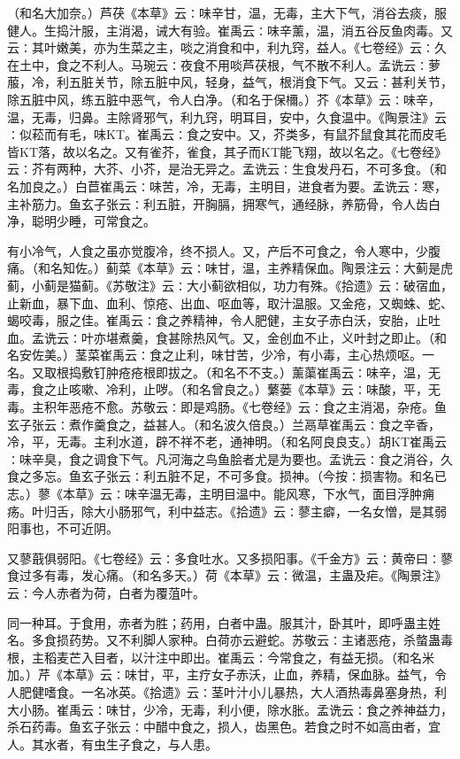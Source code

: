 \documentclass[a4paper,12pt,UTF8,twoside]{ctexbook}
\begin{document}
（和名大加奈。）芦茯《本草》云∶味辛甘，温，无毒，主大下气，消谷去痰，服健人。生捣汁服，主消渴，诫大有验。崔禹云∶味辛薰，温，消五谷反鱼肉毒。又云∶其叶嫩美，亦为生菜之主，啖之消食和中，利九窍，益人。《七卷经》云∶久在土中，食之不利人。马琬云∶夜食不用啖芦茯根，气不散不利人。孟诜云∶萝菔，冷，利五脏关节，除五脏中风，轻身，益气，根消食下气。又云∶甚利关节，除五脏中风，练五脏中恶气，令人白净。（和名于保檷。）芥《本草》云∶味辛，温，无毒，归鼻。主除肾邪气，利九窍，明耳目，安中，久食温中。《陶景注》云∶似菘而有毛，味KT。崔禹云∶食之安中。又，芥类多，有鼠芥鼠食其花而皮毛皆KT落，故以名之。又有雀芥，雀食，其子而KT能飞翔，故以名之。《七卷经》云∶芥有两种，大芥、小芥，是治无异之。孟诜云∶生食发丹石，不可多食。（和名加良之。）白苣崔禹云∶味苦，冷，无毒，主明目，进食者为要。孟诜云∶寒，主补筋力。鱼玄子张云∶利五脏，开胸膈，拥寒气，通经脉，养筋骨，令人齿白净，聪明少睡，可常食之。

有小冷气，人食之虽亦觉腹冷，终不损人。又，产后不可食之，令人寒中，少腹痛。（和名知佐。）蓟菜《本草》云∶味甘，温，主养精保血。陶景注云∶大蓟是虎蓟，小蓟是猫蓟。《苏敬注》云∶大小蓟欲相似，功力有殊。《拾遗》云∶破宿血，止新血，暴下血、血利、惊疮、出血、呕血等，取汁温服。又金疮，又蜘蛛、蛇、蝎咬毒，服之佳。崔禹云∶食之养精神，令人肥健，主女子赤白沃，安胎，止吐血。孟诜云∶叶亦堪煮羹，食甚除热风气。又，金创血不止，义叶封之即止。（和名安佐美。）茎菜崔禹云∶食之止利，味甘苦，少冷，有小毒，主心热烦呕。一名。又取根捣敷钉肿疮疮根即拔之。（和名不不支。）薰蕖崔禹云∶味辛，温，无毒，食之止咳嗽、冷利，止哕。（和名曾良之。）蘩蒌《本草》云∶味酸，平，无毒。主积年恶疮不愈。苏敬云∶即是鸡肠。《七卷经》云∶食之主消渴，杂疮。鱼玄子张云∶煮作羹食之，益甚人。（和名波久倍良。）兰鬲草崔禹云∶食之辛香，冷，平，无毒。主利水道，辟不祥不老，通神明。（和名阿良良支。）胡KT崔禹云∶味辛臭，食之调食下气。凡河海之鸟鱼脍者尤是为要也。孟诜云∶食之消谷，久食之多忘。鱼玄子张云∶利五脏不足，不可多食。损神。（今按∶损害物。和名已志。）蓼《本草》云∶味辛温无毒，主明目温中。能风寒，下水气，面目浮肿痈疡。叶归舌，除大小肠邪气，利中益志。《拾遗》云∶蓼主癖，一名女憎，是其弱阳事也，不可近阴。

又蓼蕺俱弱阳。《七卷经》云∶多食吐水。又多损阳事。《千金方》云∶黄帝曰∶蓼食过多有毒，发心痛。（和名多天。）荷《本草》云∶微温，主蛊及疟。《陶景注》云∶今人赤者为荷，白者为覆菹叶。

同一种耳。于食用，赤者为胜；药用，白者中蛊。服其汁，卧其叶，即呼蛊主姓名。多食损药势。又不利脚人家种。白荷亦云避蛇。苏敬云∶主诸恶疮，杀螫蛊毒根，主稻麦芒入目者，以汁注中即出。崔禹云∶今常食之，有益无损。（和名米加。）芹《本草》云∶味甘，平，主疗女子赤沃，止血，养精，保血脉。益气，令人肥健嗜食。一名冰英。《拾遗》云∶茎叶汁小儿暴热，大人酒热毒鼻塞身热，利大小肠。崔禹云∶味甘，少冷，无毒，利小便，除水胀。孟诜云∶食之养神益力，杀石药毒。鱼玄子张云∶中醋中食之，损人，齿黑色。若食之时不如高由者，宜人。其水者，有虫生子食之，与人患。
\end{document}
